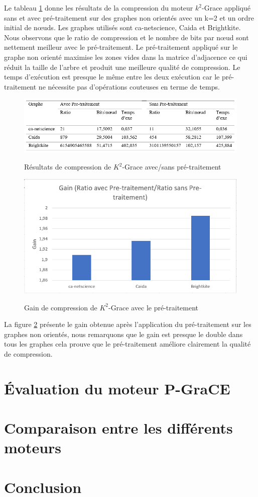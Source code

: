 Le tableau \ref{fig:tab-pret } donne les résultats de la compression du moteur $k^2$-Grace appliqué sans et avec pré-traitement sur des graphes non orientés avec un k=2 et un ordre initial de nœuds. Les graphes utilisés sont ca-netscience, Caida et Brightkite. 
Nous observons que le ratio de compression et le nombre de bits par nœud sont nettement meilleur avec le pré-traitement. Le pré-traitement appliqué sur le graphe non orienté maximise les zones vides dans la matrice d'adjacence ce qui réduit la taille de l'arbre et produit une meilleure qualité de compression. Le temps d'exécution est presque le même entre les deux exécution car le pré-traitement ne nécessite pas d'opérations couteuses en terme de temps.  

\begin{figure}[H]
	\centering
	\includegraphics[scale=1]{ressources/image/Tests/tab-pret.png}
	\label{fig:tab-pret }
	\caption{Résultats de compression de $K^2$-Grace avec/sans pré-traitement}
\end{figure}


\begin{figure}[H]
	\centering
	\includegraphics[scale=1]{ressources/image/Tests/gain.png}
	\label{fig:gain }
	\caption{Gain de compression de $K^2$-Grace avec le pré-traitement}
\end{figure}

La figure \ref{fig:gain } présente le gain obtenue après l'application du pré-traitement sur les graphes non orientés, nous remarquons que le gain est presque le double dans tous les graphes cela prouve que le pré-traitement améliore clairement la qualité de compression.
	\section{Évaluation du moteur P-GraCE}
	
	\section{Comparaison entre les différents moteurs}
	
	\section{Conclusion}